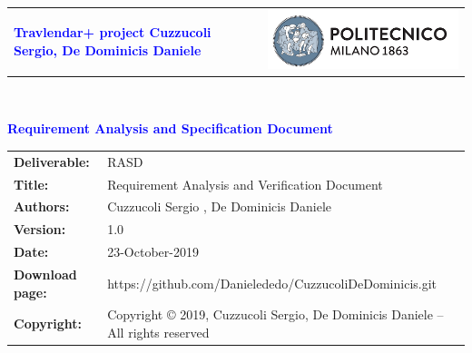 




\begin{titlepage}



{\begin{table}[t!]
\centering
\begin{tabu} to \textwidth { X[1.3,r,p] X[1.7,l,p] }
\textcolor{Blue}
{\textbf{\small{Travlendar+ project Cuzzucoli Sergio, De Dominicis Daniele}}} & \includegraphics[scale=0.5]{Images/PolimiLogo}
\end{tabu}
\end{table}}~\\ [7cm]


\begin{flushleft}

{\textcolor{Blue}{\textbf{\Huge{Requirement Analysis and Specification
        Document}}}} \\ [1cm]

\end{flushleft}

\end{titlepage}

\begin{table}[h!]
\begin{tabu} to \textwidth { X[0.3,r,p] X[0.7,l,p] }
\hline

\textbf{Deliverable:} & RASD\\
\textbf{Title:} & Requirement Analysis and Verification Document \\
\textbf{Authors:} & Cuzzucoli Sergio , De Dominicis Daniele \\
\textbf{Version:} & 1.0 \\ 
\textbf{Date:} & 23-October-2019  \\
\textbf{Download page:} & https://github.com/Danielededo/CuzzucoliDeDominicis.git \\
\textbf{Copyright:} & Copyright © 2019, Cuzzucoli Sergio, De Dominicis Daniele – All rights reserved \\
\hline
\end{tabu}
\end{table}




